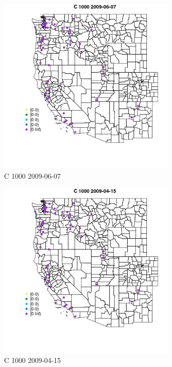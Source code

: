 \begin{figure} 
\centering  
\includegraphics[width=0.77\textwidth]{Code_Outputs/Report_ML_input_PM25_Step4_part_e_de_duplicated_aves_MapObsC_10002009-06-07.jpg} 
\caption{\label{fig:Report_ML_input_PM25_Step4_part_e_de_duplicated_avesMapObsC_10002009-06-07}C 1000 2009-06-07} 
\end{figure} 
 

\begin{figure} 
\centering  
\includegraphics[width=0.77\textwidth]{Code_Outputs/Report_ML_input_PM25_Step4_part_e_de_duplicated_aves_MapObsC_10002009-04-15.jpg} 
\caption{\label{fig:Report_ML_input_PM25_Step4_part_e_de_duplicated_avesMapObsC_10002009-04-15}C 1000 2009-04-15} 
\end{figure} 
 

